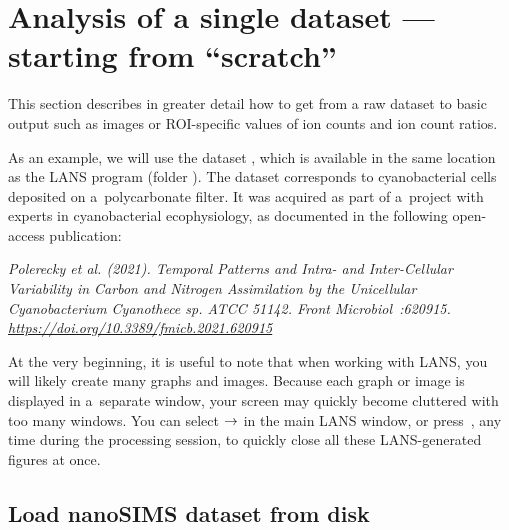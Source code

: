 \section{Analysis of a single dataset --- starting from ``scratch''}
\label{sec:level1}

\purplebox{}
This section describes in greater detail how to get from a raw dataset to basic output such as images or ROI-specific values of ion counts and ion count ratios. 
\tcbe

As an example, we will use the dataset , which is available in the same location as the LANS program (folder ). The dataset corresponds to cyanobacterial cells deposited on a~polycarbonate filter. It was acquired as part of a~project with experts in cyanobacterial ecophysiology, as documented in the following open-access publication:
\vskip1mm
\begin{center}
\begin{minipage}{0.93\textwidth}
\textsl{\small Polerecky et al. (2021). Temporal Patterns and Intra- and Inter-Cellular Variability in Carbon and Nitrogen Assimilation by the Unicellular Cyanobacterium Cyanothece sp. ATCC 51142. \emph{Front Microbiol}~:620915. \url{https://doi.org/10.3389/fmicb.2021.620915}}
\end{minipage}
\end{center}

\purplebox{}
At the very beginning, it is useful to note that when working with LANS, you will likely create many graphs and images. Because each graph or image is displayed in a~separate window, your screen may quickly become cluttered with too many windows. You can select  $\rightarrow$  in the main LANS window, or press~, any time during the processing session, to quickly close all these LANS-generated figures at once.
\tcbe


\subsection{Load nanoSIMS dataset from disk}
\setcounter{step}{0}

\vskip2.5mm


